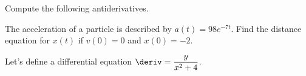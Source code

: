 \begin{questions}
    \question Compute the following antiderivatives. \\


    \horizontalline
    
    \question The acceleration of a particle is described by $a(t) = 98e^{-7t}$. Find the distance equation for $x(t)$ if $v(0) = 0$ and $x(0) = -2$.

    \vfill

    \horizontalline

    \newpage

    \question Let's define a differential equation $\deriv = \dfrac{y}{x^2 + 4}$. \\

    \begin{parts}

\end{parts}
\end{questions}
